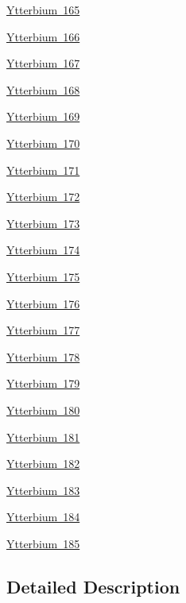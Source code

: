 \begin{DoxyCompactItemize}
\item 
\mbox{\hyperlink{group___isotope_const-_ytterbium-_yb165}{Ytterbium 165}}
\item 
\mbox{\hyperlink{group___isotope_const-_ytterbium-_yb166}{Ytterbium 166}}
\item 
\mbox{\hyperlink{group___isotope_const-_ytterbium-_yb167}{Ytterbium 167}}
\item 
\mbox{\hyperlink{group___isotope_const-_ytterbium-_yb168}{Ytterbium 168}}
\item 
\mbox{\hyperlink{group___isotope_const-_ytterbium-_yb169}{Ytterbium 169}}
\item 
\mbox{\hyperlink{group___isotope_const-_ytterbium-_yb170}{Ytterbium 170}}
\item 
\mbox{\hyperlink{group___isotope_const-_ytterbium-_yb171}{Ytterbium 171}}
\item 
\mbox{\hyperlink{group___isotope_const-_ytterbium-_yb172}{Ytterbium 172}}
\item 
\mbox{\hyperlink{group___isotope_const-_ytterbium-_yb173}{Ytterbium 173}}
\item 
\mbox{\hyperlink{group___isotope_const-_ytterbium-_yb174}{Ytterbium 174}}
\item 
\mbox{\hyperlink{group___isotope_const-_ytterbium-_yb175}{Ytterbium 175}}
\item 
\mbox{\hyperlink{group___isotope_const-_ytterbium-_yb176}{Ytterbium 176}}
\item 
\mbox{\hyperlink{group___isotope_const-_ytterbium-_yb177}{Ytterbium 177}}
\item 
\mbox{\hyperlink{group___isotope_const-_ytterbium-_yb178}{Ytterbium 178}}
\item 
\mbox{\hyperlink{group___isotope_const-_ytterbium-_yb179}{Ytterbium 179}}
\item 
\mbox{\hyperlink{group___isotope_const-_ytterbium-_yb180}{Ytterbium 180}}
\item 
\mbox{\hyperlink{group___isotope_const-_ytterbium-_yb181}{Ytterbium 181}}
\item 
\mbox{\hyperlink{group___isotope_const-_ytterbium-_yb182}{Ytterbium 182}}
\item 
\mbox{\hyperlink{group___isotope_const-_ytterbium-_yb183}{Ytterbium 183}}
\item 
\mbox{\hyperlink{group___isotope_const-_ytterbium-_yb184}{Ytterbium 184}}
\item 
\mbox{\hyperlink{group___isotope_const-_ytterbium-_yb185}{Ytterbium 185}}
\end{DoxyCompactItemize}


\subsection{Detailed Description}
